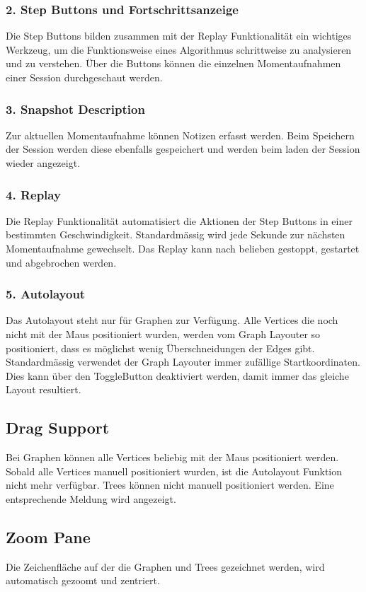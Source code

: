 \documentclass[11pt,a4paper,english,oneside]{book}
\numberwithin{equation}{chapter}
\begin{document}
	\subsubsection{2. Step Buttons und Fortschrittsanzeige}
	Die Step Buttons bilden zusammen mit der Replay Funktionalität ein wichtiges Werkzeug, um die Funktionsweise eines Algorithmus schrittweise zu analysieren und zu verstehen. Über die Buttons können die einzelnen Momentaufnahmen einer Session durchgeschaut werden.
	
	\subsubsection{3. Snapshot Description}
	Zur aktuellen Momentaufnahme können Notizen erfasst werden. Beim Speichern der Session werden diese ebenfalls gespeichert und werden beim laden der Session wieder angezeigt.
	
	\subsubsection{4. Replay}
	Die Replay Funktionalität automatisiert die Aktionen der Step Buttons in einer bestimmten Geschwindigkeit. Standardmässig wird jede Sekunde zur nächsten Momentaufnahme gewechselt. Das Replay kann nach belieben gestoppt, gestartet und abgebrochen werden.
	
	\subsubsection{5. Autolayout}
	Das Autolayout steht nur für Graphen zur Verfügung. Alle Vertices die noch nicht mit der Maus positioniert wurden, werden vom Graph Layouter so positioniert, dass es möglichst wenig Überschneidungen der Edges gibt. Standardmässig verwendet der Graph Layouter immer zufällige Startkoordinaten. Dies kann über den ToggleButton deaktiviert werden, damit immer das gleiche Layout resultiert.
	
	\subsection{Drag Support}
	Bei Graphen können alle Vertices beliebig mit der Maus positioniert werden. Sobald alle Vertices manuell positioniert wurden, ist die Autolayout Funktion nicht mehr verfügbar. Trees können nicht manuell positioniert werden. Eine entsprechende Meldung wird angezeigt.
	
	\subsection{Zoom Pane}
	Die Zeichenfläche auf der die Graphen und Trees gezeichnet werden, wird automatisch gezoomt und zentriert. 
	
\end{document}
